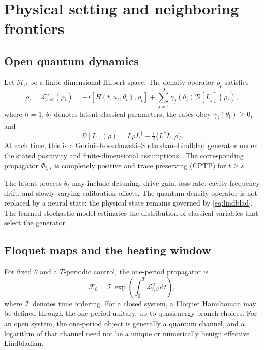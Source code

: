 \documentclass[10pt,twoside]{article}
\newcommand{\D}{\mathcal D}
\newcommand{\Lind}{\mathcal L}
\newcommand{\dd}{\,\mathrm d}
\begin{document}
\section{Physical setting and neighboring frontiers}

\subsection{Open quantum dynamics}

Let $\mathcal H_d$ be a finite-dimensional Hilbert space. The density operator $\rho_t$ satisfies
\begin{equation}
\dot\rho_t=\Lind_{t,\theta_t}^{u}(\rho_t)
=-i[H(t,u_t,\theta_t),\rho_t]
+\sum_{j=1}^{J}\gamma_j(\theta_t)\D[L_j](\rho_t),
\label{eq:lindblad}
\end{equation}
where $\hbar=1$, $\theta_t$ denotes latent classical parameters, the rates obey $\gamma_j(\theta_t)\geq0$, and
\begin{equation}
\D[L](\rho)=L\rho L^\dagger-\tfrac12\{L^\dagger L,\rho\}.
\end{equation}
At each time, this is a Gorini--Kossakowski--Sudarshan--Lindblad generator under the stated positivity and finite-dimensional assumptions \citep{gorini1976semigroup,lindblad1976generators}. The corresponding propagator $\Phi_{t,s}$ is completely positive and trace preserving (CPTP) for $t\geq s$.

The latent process $\theta_t$ may include detuning, drive gain, loss rate, cavity frequency drift, and slowly varying calibration offsets. The quantum density operator is not replaced by a neural state: the physical state remains governed by \cref{eq:lindblad}. The learned stochastic model estimates the distribution of classical variables that select the generator.

\subsection{Floquet maps and the heating window}

For fixed $\theta$ and a $T$-periodic control, the one-period propagator is
\begin{equation}
\mathcal F_\theta=\mathcal T\exp\!\left(\int_0^T\Lind_{t,\theta}^{u}\dd t\right),
\label{eq:floquetmap}
\end{equation}
where $\mathcal T$ denotes time ordering. For a closed system, a Floquet Hamiltonian may be defined through the one-period unitary, up to quasienergy-branch choices. For an open system, the one-period object is generally a quantum channel, and a logarithm of that channel need not be a unique or numerically benign effective Lindbladian.
\end{document}

